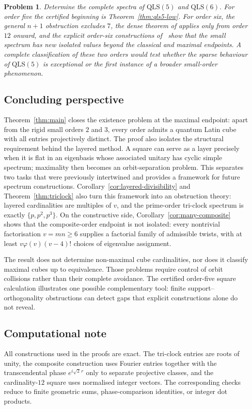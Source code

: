 \documentclass[11pt]{amsart}
\newtheorem{problem}[theorem]{Problem}
\theoremstyle{definition}
\newcommand{\QLS}{\mathrm{QLS}}
\begin{document}
\begin{problem}\label{prob:small-square-spectra}
Determine the complete spectra of $\QLS(5)$ and $\QLS(6)$.  For order five
the certified beginning is Theorem~\ref{thm:qls5-low}.  For order six, the
general $n+1$ obstruction excludes $7$, the dense theorem of
\cite{ZhangJi2026} applies only from order $12$ onward, and the explicit
order-six constructions of~\cite{Xu2026} show that the small spectrum has
new isolated values beyond the classical and maximal endpoints.  A complete
classification of these two orders would test whether the sparse behaviour
of $\QLS(5)$ is exceptional or the first instance of a broader small-order
phenomenon.
\end{problem}

\subsection*{Concluding perspective}
Theorem~\ref{thm:main} closes the existence problem at the maximal endpoint:
apart from the rigid small orders $2$ and $3$, every order admits a quantum
Latin cube with all entries projectively distinct.  The proof also isolates
the structural requirement behind the layered method.  A square can serve
as a layer precisely when it is flat in an eigenbasis whose associated
unitary has cyclic simple spectrum; maximality then becomes an
orbit-separation problem.  This separates two tasks that were previously
intertwined and provides a framework for future spectrum constructions.
Corollary~\ref{cor:layered-divisibility} and Theorem~\ref{thm:triclock}
also turn this framework into an obstruction theory: layered cardinalities
are multiples of $v$, and the prime-order tri-clock spectrum is exactly
$\{p,p^2,p^3\}$.  On the constructive side,
Corollary~\ref{cor:many-composite} shows that the composite-order endpoint is
not isolated: every nontrivial factorisation $v=mn\ge6$ supplies a factorial
family of admissible twists, with at least $v\varphi(v)(v-4)!$ choices of
eigenvalue assignment.

The result does not determine non-maximal cube cardinalities, nor does it
classify maximal cubes up to equivalence.  Those problems require control of
orbit collisions rather than their complete avoidance.  The certified
order-five square calculation illustrates one possible complementary tool:
finite support--orthogonality obstructions can detect gaps that explicit
constructions alone do not reveal.

\subsection*{Computational note}
All constructions used in the proofs are exact.  The tri-clock entries are
roots of unity, the composite construction uses Fourier entries together
with the transcendental phase $e^{i\sqrt2\,r}$ only to separate projective
classes, and the cardinality-$12$ square uses normalised integer vectors.
The corresponding checks reduce to finite geometric sums, phase-comparison
identities, or integer dot products.
\end{document}
